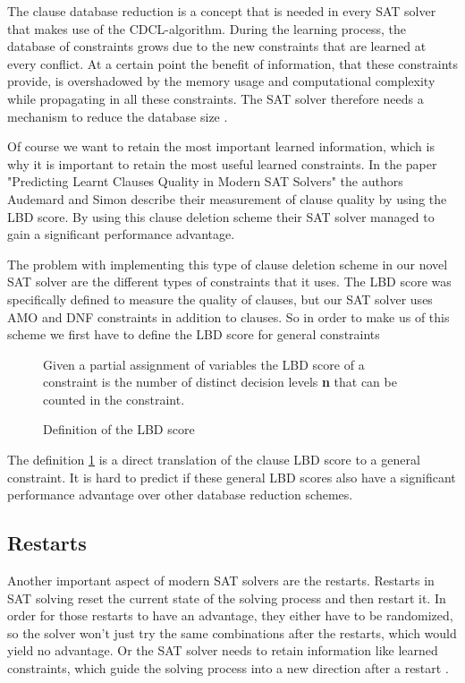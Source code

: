 The clause database reduction is a concept that is needed in every SAT solver that makes use of the CDCL-algorithm. During the learning process, the database of constraints grows due to the new constraints that are learned at every conflict. At a certain point the benefit of information, that these constraints provide, is overshadowed by the memory usage and computational complexity while propagating in all these constraints. The SAT solver therefore needs a mechanism to reduce the database size \cite{biere2009handbook}.

Of course we want to retain the most important learned information, which is why it is important to retain the most useful learned constraints. In the paper "Predicting Learnt Clauses Quality in Modern SAT Solvers" \cite{audemard2009predicting} the authors Audemard and Simon describe their measurement of clause quality by using the LBD score. By using this clause deletion scheme their SAT solver managed to gain a significant performance advantage.

The problem with implementing this type of clause deletion scheme in our novel SAT solver are the different types of constraints that it uses. The LBD score was specifically defined to measure the quality of clauses, but our SAT solver uses AMO and DNF constraints in addition to clauses. So in order to make us of this scheme we first have to define the LBD score for general constraints

\begin{figure}[!htb]
\begin{leftbar}
Given a partial assignment of variables the LBD score of a constraint is the number of distinct decision levels \textbf{n} that can be counted in the constraint.
\end{leftbar}
\caption{Definition of the LBD score}
\label{def:LBD}
\end{figure}

The definition \ref{def:LBD} is a direct translation of the clause LBD score to a general constraint. It is hard to predict if these general LBD scores also have a significant performance advantage over other database reduction schemes.

\subsection{Restarts}

Another important aspect of modern SAT solvers are the restarts. Restarts in SAT solving reset the current state of the solving process and then restart it. In order for those restarts to have an advantage, they either have to be randomized, so the solver won't just try the same combinations after the restarts, which would yield no advantage. Or the SAT solver needs to retain information like learned constraints, which guide the solving process into a new direction after a restart \cite{biere2009handbook}.


